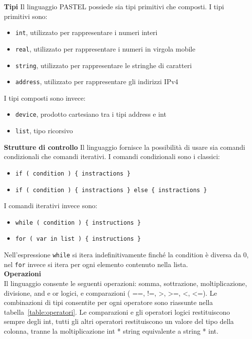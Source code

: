 \documentclass[10pt]{article}
\begin{document}
\textbf{Tipi}
Il linguaggio PASTEL possiede sia tipi primitivi che composti. I tipi primitivi sono:
\begin{itemize}
\item \texttt{int}, utilizzato per rappresentare i numeri interi
\item \texttt{real}, utilizzato per rappresentare i numeri in virgola mobile
\item \texttt{string}, utilizzato per rappresentare le stringhe di caratteri
\item \texttt{address}, utilizzato per rappresentare gli indirizzi IPv4
\end{itemize}

I tipi composti sono invece:
\begin{itemize}
\item \texttt{device}, prodotto cartesiano tra i tipi address e int 
\item \texttt{list}, tipo ricorsivo 
\end{itemize}

\textbf{Strutture di controllo}
Il linguaggio fornisce la possibilità di usare sia comandi condizionali che comandi iterativi. I comandi condizionali sono i classici:
\begin{itemize}
\item \texttt{if ( condition ) \{ instractions \}}
\item \texttt{if ( condition ) \{ instractions \} else \{ instractions \}}
\end{itemize}
I comandi iterativi invece sono:
\begin{itemize}
\item \texttt{while ( condition ) \{ instructions \}}
\item \texttt{for ( var in list ) \{ instructions \} }
\end{itemize}
Nell'espressione \texttt{while} si itera indefinitivamente finché la condition è diversa da 0, nel \texttt{for} invece si itera per ogni elemento contenuto nella lista.\\

\textbf{Operazioni}\\
Il linguaggio consente le seguenti operazioni: somma, sottrazione, moltiplicazione, divisione, and e or logici, e comparazioni ( ==, !=, >, >=, <, <=). Le combinazioni di tipi consentite per ogni operatore sono riassunte nella tabella~\ref{table:operatori}. Le comparazioni e gli operatori logici restituiscono sempre degli int, tutti gli altri operatori restituiscono un valore del tipo della colonna, tranne la moltiplicazione int * string equivalente a string * int. \\
\end{document}
